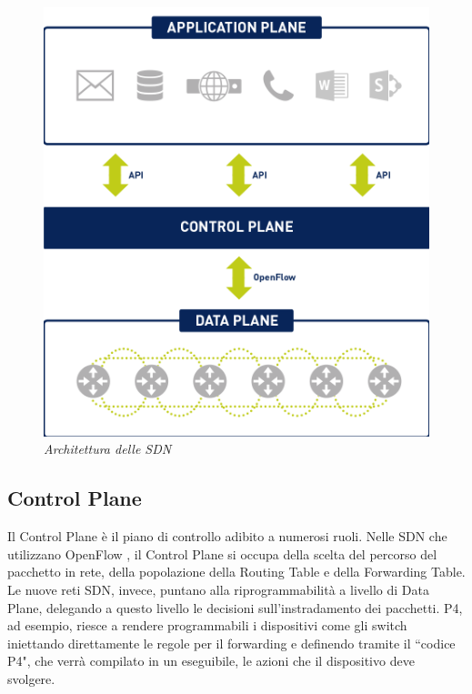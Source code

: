 \begin{figure}[!htbp] 
    \centering
    \includegraphics[scale=0.32]{images/sdn.png}
    \caption{\textit{Architettura delle SDN}}
    \label{fig:sdn}
\end{figure}
\FloatBarrier

\subsection*{Control Plane}

Il Control Plane è il piano di controllo adibito a numerosi ruoli.
Nelle SDN che utilizzano OpenFlow \cite{noauthor_openflow}, il Control Plane si occupa della scelta del percorso del pacchetto in rete, della popolazione della Routing Table e della Forwarding Table.
Le nuove reti SDN, invece, puntano alla riprogrammabilità a livello di Data Plane, delegando a questo livello le decisioni sull'instradamento dei pacchetti. P4, ad esempio, riesce a rendere programmabili i dispositivi come gli switch iniettando direttamente le regole per il forwarding e definendo tramite il ``codice P4", che verrà compilato in un eseguibile, le azioni che il dispositivo deve svolgere.\\

